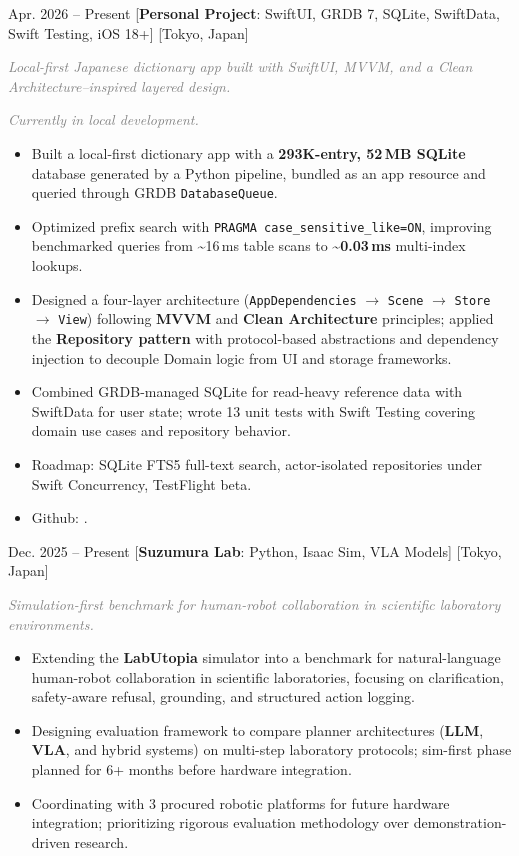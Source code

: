 \documentclass{resume}
\newcommand{\projectgap}{\vspace{0.55em}}
\newcommand{\itemsummary}[1]{{\setlength{\parindent}{12pt}\small\textit{\textcolor{gray}{#1}}\par}}
\begin{document}
{Apr. 2026 -- Present}
[\textbf{Personal Project}: SwiftUI, GRDB 7, SQLite, SwiftData, Swift Testing, iOS 18+]
[Tokyo, Japan]
\itemsummary{Local-first Japanese dictionary app built with SwiftUI, MVVM, and a Clean Architecture–inspired layered design.}
\itemsummary{Currently in local development.}
\begin{itemize}
	\item Built a local-first dictionary app with a \textbf{293K-entry, 52\,MB SQLite} database generated by a Python pipeline, bundled as an app resource and queried through GRDB \texttt{DatabaseQueue}.
	\item Optimized prefix search with \texttt{PRAGMA case\_sensitive\_like=ON}, improving benchmarked queries from \textasciitilde16\,ms table scans to \textbf{\textasciitilde0.03\,ms} multi-index lookups.
	\item Designed a four-layer architecture (\texttt{AppDependencies} $\rightarrow$ \texttt{Scene} $\rightarrow$ \texttt{Store} $\rightarrow$ \texttt{View}) following \textbf{MVVM} and \textbf{Clean Architecture} principles; applied the \textbf{Repository pattern} with protocol-based abstractions and dependency injection to decouple Domain logic from UI and storage frameworks.
	\item Combined GRDB-managed SQLite for read-heavy reference data with SwiftData for user state; wrote 13 unit tests with Swift Testing covering domain use cases and repository behavior.
	\item Roadmap: SQLite FTS5 full-text search, actor-isolated repositories under Swift Concurrency, TestFlight beta.
	\item Github: .
\end{itemize}

\projectgap

{Dec. 2025 -- Present}
[\textbf{Suzumura Lab}: Python, Isaac Sim, VLA Models]
[Tokyo, Japan]
\itemsummary{Simulation-first benchmark for human-robot collaboration in scientific laboratory environments.}
\begin{itemize}
	\item Extending the \textbf{LabUtopia} simulator into a benchmark for natural-language human-robot collaboration in scientific laboratories, focusing on clarification, safety-aware refusal, grounding, and structured action logging.
	\item Designing evaluation framework to compare planner architectures (\textbf{LLM}, \textbf{VLA}, and hybrid systems) on multi-step laboratory protocols; sim-first phase planned for 6+ months before hardware integration.
	\item Coordinating with 3 procured robotic platforms for future hardware integration; prioritizing rigorous evaluation methodology over demonstration-driven research.
\end{itemize}
\end{document}
